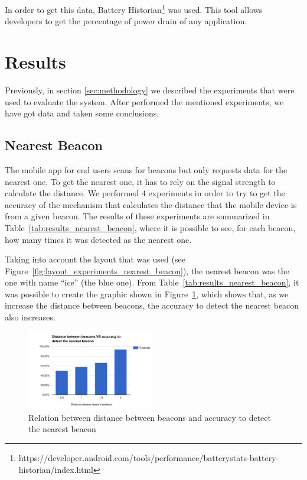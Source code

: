 In order to get this data, Battery Historian\footnote{https://developer.android.com/tools/performance/batterystats-battery-historian/index.html} was used. This tool allows developers to get the percentage of power drain of any application.

\section{Results}
\label{sec:results}
Previously, in section \ref{sec:methodology} we described the experiments that were used to evaluate the system.
After performed the mentioned experiments, we have got data and taken some conclusions.

\subsection{Nearest Beacon}
\label{sub:results_nearest_beacon}
The mobile app for end users scans for beacons but only requests data for the nearest one. To get the nearest one, it has to rely on the signal strength to calculate the distance. We performed 4 experiments in order to try to get the accuracy of the mechanism that calculates the distance that the mobile device is from a given beacon.
The results of these experiments are summarized in Table~\ref{tab:results_nearest_beacon}, where it is possible to see, for each beacon, how many times it was detected as the nearest one.

Taking into account the layout that was used (see Figure~\ref{fig:layout_experiments_nearest_beacon}), the nearest beacon was the one with name ``ice'' (the blue one).
From Table~\ref{tab:results_nearest_beacon}, it was possible to create the graphic shown in Figure~\ref{fig:results_experiments_nearest_beacon}, which shows that, as we increase the distance between beacons, the accuracy to detect the nearest beacon also increases.



\begin{figure}[!ht]
  \centering
    \includegraphics[width=0.5\textwidth, keepaspectratio]{images/results_nearest_beacon}
    \caption[Distance between beacons vs Accuracy]{Relation between distance between beacons and accuracy to detect the nearest beacon}
    \label{fig:results_experiments_nearest_beacon}
\end{figure}

